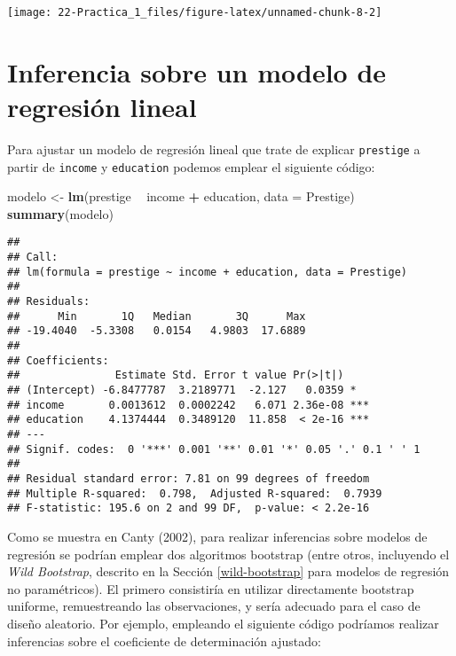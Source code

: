 \documentclass[
]{book}
\newenvironment{Shaded}{\begin{snugshade}}{\end{snugshade}}
\newcommand{\DataTypeTok}[1]{\textcolor[rgb]{0.13,0.29,0.53}{#1}}
\newcommand{\KeywordTok}[1]{\textcolor[rgb]{0.13,0.29,0.53}{\textbf{#1}}}
\newcommand{\NormalTok}[1]{#1}
\newcommand{\OperatorTok}[1]{\textcolor[rgb]{0.81,0.36,0.00}{\textbf{#1}}}
\newcommand{\StringTok}[1]{\textcolor[rgb]{0.31,0.60,0.02}{#1}}
\theoremstyle{definition}
\theoremstyle{definition}
\theoremstyle{definition}
\theoremstyle{remark}
\begin{document}
\begin{center}\texttt{[image: 22-Practica\_1\_files/figure-latex/unnamed-chunk-8-2]} \end{center}

\hypertarget{bootmod}{%
\section{Inferencia sobre un modelo de regresión lineal}\label{bootmod}}

Para ajustar un modelo de regresión lineal que trate de explicar \texttt{prestige}
a partir de \texttt{income} y \texttt{education} podemos emplear el siguiente código:

\begin{Shaded}
\begin{Highlighting}[]
\NormalTok{modelo <-}\StringTok{ }\KeywordTok{lm}\NormalTok{(prestige }\OperatorTok{~}\StringTok{ }\NormalTok{income }\OperatorTok{+}\StringTok{ }\NormalTok{education, }\DataTypeTok{data =}\NormalTok{ Prestige)}
\KeywordTok{summary}\NormalTok{(modelo)}
\end{Highlighting}
\end{Shaded}

\begin{verbatim}
## 
## Call:
## lm(formula = prestige ~ income + education, data = Prestige)
## 
## Residuals:
##      Min       1Q   Median       3Q      Max 
## -19.4040  -5.3308   0.0154   4.9803  17.6889 
## 
## Coefficients:
##               Estimate Std. Error t value Pr(>|t|)    
## (Intercept) -6.8477787  3.2189771  -2.127   0.0359 *  
## income       0.0013612  0.0002242   6.071 2.36e-08 ***
## education    4.1374444  0.3489120  11.858  < 2e-16 ***
## ---
## Signif. codes:  0 '***' 0.001 '**' 0.01 '*' 0.05 '.' 0.1 ' ' 1
## 
## Residual standard error: 7.81 on 99 degrees of freedom
## Multiple R-squared:  0.798,  Adjusted R-squared:  0.7939 
## F-statistic: 195.6 on 2 and 99 DF,  p-value: < 2.2e-16
\end{verbatim}

Como se muestra en Canty (2002), para realizar inferencias sobre modelos
de regresión se podrían emplear dos algoritmos bootstrap (entre otros,
incluyendo el \emph{Wild Bootstrap}, descrito en la Sección \ref{wild-bootstrap}
para modelos de regresión no paramétricos).
El primero consistiría en utilizar directamente bootstrap uniforme,
remuestreando las observaciones, y sería adecuado para el caso de
diseño aleatorio. Por ejemplo, empleando el siguiente código
podríamos realizar inferencias sobre el coeficiente de determinación ajustado:
\end{document}
